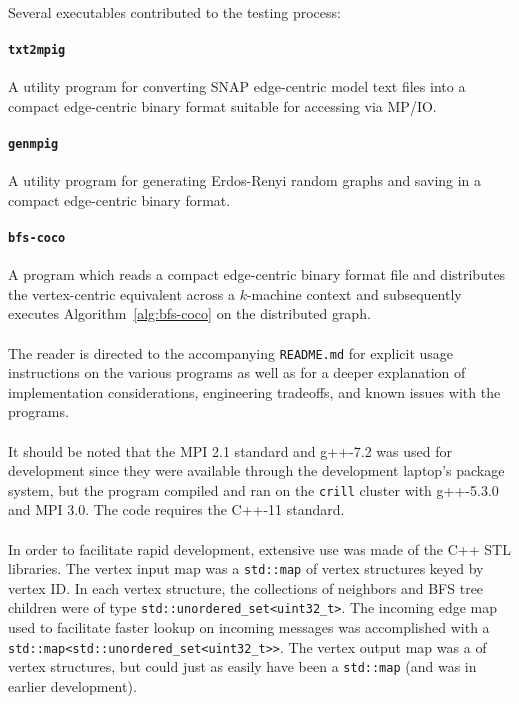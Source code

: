 \documentclass[11pt,epsf]{article}
\begin{document}
{{    \paragraph{}{
      Several executables contributed to the testing process:
    }
    \paragraph{\texttt{txt2mpig}}{
      A utility program for converting SNAP edge-centric model text files
      into a compact edge-centric binary format suitable for accessing via MP/IO.
    }
    \paragraph{\texttt{genmpig}}{
      A utility program for generating Erdos-Renyi random graphs and saving
      in a compact edge-centric binary format.
    }
    \paragraph{\texttt{bfs-coco}}{
      A program which reads a compact edge-centric binary format file and
      distributes the vertex-centric equivalent across a $k$-machine context
      and subsequently executes Algorithm~\ref{alg:bfs-coco} on the distributed graph.
    }
    \paragraph{}{
      The reader is directed to the accompanying \texttt{README.md} for
      explicit usage instructions on the various programs as well as
      for a deeper explanation of implementation considerations,
      engineering tradeoffs, and known issues with the programs.
    }
    \paragraph{}{
      It should be noted that the MPI 2.1 standard\autocite{MPI21} and g++-7.2
      was used for development since they were available through the development
      laptop's package system, but the program compiled and ran on the \texttt{crill}
      cluster with g++-5.3.0 and MPI 3.0. The code requires the C++-11 standard.
    }
    \paragraph{}{
      In order to facilitate rapid development, extensive use was made of the C++ STL
      libraries. The vertex input map was a \texttt{std::map}\autocite{map}
      of vertex structures keyed by vertex ID. In each vertex structure, the collections
      of neighbors and BFS tree children were of type \texttt{std::unordered\_set<uint32\_t>}\autocite{unorderedset}.
      The incoming edge map used to facilitate faster lookup on incoming messages was
      accomplished with a \texttt{std::map<std::unordered\_set<uint32\_t>>}. The vertex output
      map was a \texttt<std::vector>\autocite{vector} of vertex structures, but could just
      as easily have been a \texttt{std::map} (and was in earlier development).
    }
}}
\end{document}
